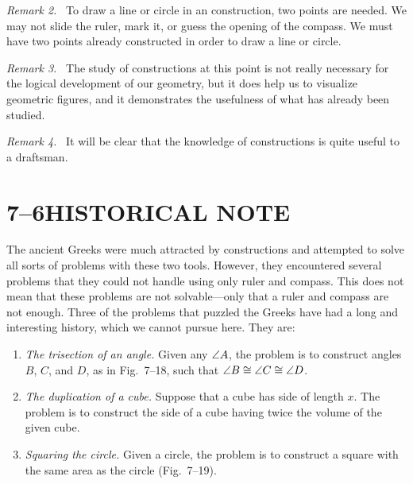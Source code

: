 \documentclass[11pt]{book}
\newenvironment{VIIremarkn}[1]%
  {\par\medskip\noindent\emph{Remark #1.}\ }{\par\medskip}
\begin{document}
\begin{VIIremarkn}{2}
To draw a line or circle in an \RC{} construction, two points are needed. We
may not slide the ruler, mark it, or guess the opening of the compass. We must
have two points already constructed in order to draw a line or circle.
\end{VIIremarkn}

\begin{VIIremarkn}{3}
The study of \RC{} constructions at this point is not really necessary for the
logical development of our geometry, but it does help us to visualize geometric
figures, and it demonstrates the usefulness of what has already been studied.
\end{VIIremarkn}

\begin{VIIremarkn}{4}
It will be clear that the knowledge of \RC{} constructions is quite useful to a
draftsman.
\end{VIIremarkn}

\section*{7--6\quad HISTORICAL NOTE}

The ancient Greeks were much attracted by \RC{} constructions and attempted to
solve all sorts of problems with these two tools. However, they encountered
several problems that they could not handle using only ruler and compass. This
does not mean that these problems are not solvable---only that a ruler and
compass are not enough. Three of the problems that puzzled the Greeks have had
a long and interesting history, which we cannot pursue here. They are:

\begin{enumerate}[label=(\alph*), leftmargin=2.2em, itemsep=3pt]
\item \emph{The trisection of an angle.} Given any $\angle A$, the problem is to
  construct angles $B$, $C$, and $D$, as in Fig.~7--18, such that
  $\angle B \cong \angle C \cong \angle D$.
\item \emph{The duplication of a cube.} Suppose that a cube has side of length
  $x$. The problem is to construct the side of a cube having twice the volume
  of the given cube.
\item \emph{Squaring the circle.} Given a circle, the problem is to construct a
  square with the same area as the circle (Fig.~7--19).
\end{enumerate}
\end{document}
